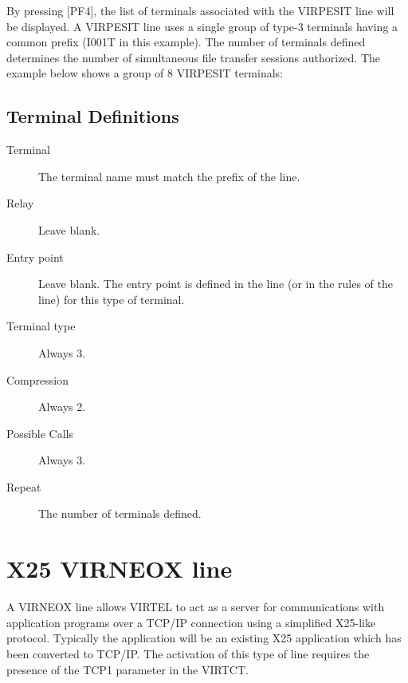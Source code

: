 \documentclass[letterpaper,10pt,english]{sphinxmanual}
\begin{document}
By pressing {[}PF4{]}, the list of terminals associated with the VIRPESIT line will be displayed. A VIRPESIT line uses a single group of type-3 terminals having a common prefix (I001T in this example). The number of terminals defined determines the number of simultaneous file transfer sessions authorized. The example below shows a group of 8 VIRPESIT terminals:


\ignorespaces 

\subsection{Terminal Definitions}
\label{\detokenize{connectivity_guide:index-57}}\label{\detokenize{connectivity_guide:id25}}\begin{description}
\item[{Terminal}] \leavevmode
The terminal name must match the prefix of the line.

\item[{Relay}] \leavevmode
Leave blank.

\item[{Entry point}] \leavevmode
Leave blank. The entry point is defined in the line (or in the rules
of the line) for this type of terminal.

\item[{Terminal type}] \leavevmode
Always 3.

\item[{Compression}] \leavevmode
Always 2.

\item[{Possible Calls}] \leavevmode
Always 3.

\item[{Repeat}] \leavevmode
The number of terminals defined.

\end{description}

\newpage

\ignorespaces 

\section{X25 VIRNEOX line}
\label{\detokenize{connectivity_guide:x25-virneox-line}}\label{\detokenize{connectivity_guide:index-58}}
A VIRNEOX line allows VIRTEL to act as a server for communications with application programs over a TCP/IP connection using a simplified X25-like protocol. Typically the application will be an  existing X25 application which has been converted to TCP/IP. The activation of this type of line requires the presence of the TCP1 parameter in the VIRTCT.
\end{document}
